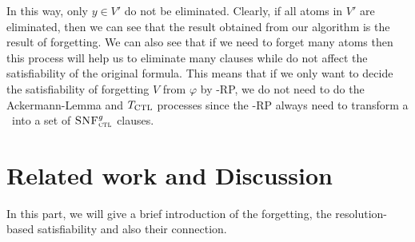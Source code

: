 \documentclass[letterpaper]{article} %
\begin{document}
In this way, only $y\in V'$ do not be eliminated. 
Clearly, if all atoms in $V'$ are eliminated, then we can see that the result obtained from our algorithm is the result of forgetting.
We can also see that if we need to forget many atoms then this process will help us to eliminate many clauses while do not affect the satisfiability of the original formula.
This means that if we only want to decide the satisfiability of forgetting $V$ from $\varphi$ by \CTL-RP, we do not need to do the Ackermann-Lemma and $T_{\textrm{CTL}}$ processes since the \CTL-RP always need to transform a \CTL\ into a set of ${\textsc{SNF}_{\textsc{ctl}}^g}$ clauses. 




\section{Related work and Discussion}
In this part, we will give a brief introduction of the forgetting, the resolution-based satisfiability and also their connection.
\end{document}
